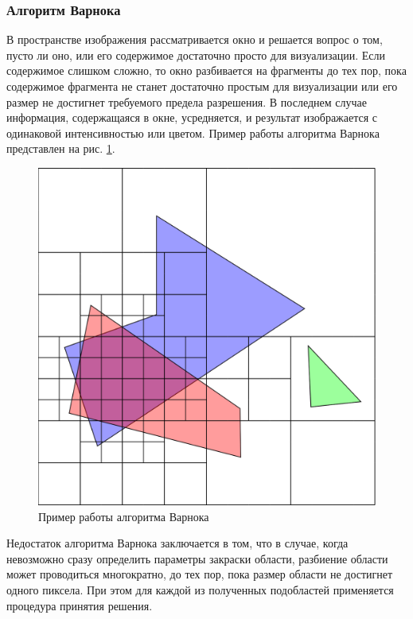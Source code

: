 \documentclass[54pt, a4paper]{article}
\begin{document}
	\subsubsection{Алгоритм Варнока}
	В пространстве изображения рассматривается окно и решается вопрос о том, пусто ли оно, или его содержимое достаточно просто для визуализации. Если содержимое слишком сложно, то окно разбивается на фрагменты до тех пор, пока содержимое фрагмента не станет достаточно простым для визуализации или его размер не достигнет требуемого предела разрешения. В последнем случае информация, содержащаяся в окне, усредняется, и результат изображается с одинаковой интенсивностью или цветом. Пример работы алгоритма Варнока представлен на рис. \ref{ris:varnok}.\\
	\begin{figure}[ht!]
		\centering
		\includegraphics[scale=0.2]{img/varnok.png}
		\caption{Пример работы алгоритма Варнока}
		\label{ris:varnok}
	\end{figure}

	Недостаток алгоритма Варнока заключается в том, что в случае, когда невозможно сразу определить параметры закраски области, разбиение области может проводиться многократно, до тех пор, пока размер области не достигнет одного пиксела. При этом для каждой из полученных подобластей применяется процедура принятия решения.\\
	
\end{document}
